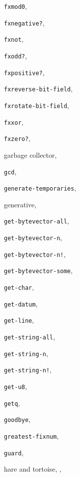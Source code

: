 {\begin{multicols}{2}
\texttt{fxmod0}, \textit{\pageref{objects_s161}}
  
\texttt{fxnegative?}, \textit{\pageref{objects_s154}}
  
\texttt{fxnot}, \textit{\pageref{objects_s163}}
  
\texttt{fxodd?}, \textit{\pageref{objects_s155}}
  
\texttt{fxpositive?}, \textit{\pageref{objects_s154}}
  
\texttt{fxreverse-bit-field}, \textit{\pageref{objects_s175}}
  
\texttt{fxrotate-bit-field}, \textit{\pageref{objects_s174}}
  
\texttt{fxxor}, \textit{\pageref{objects_s163}}
  
\texttt{fxzero?}, \textit{\pageref{objects_s154}}
  
garbage collector, \pageref{intro_s3}
  
\texttt{gcd}, \textit{\pageref{objects_s109}}
  
\texttt{generate-temporaries}, \textit{\pageref{syntax_s49}}
  
generative, \pageref{records_s4}
  
\texttt{get-bytevector-all}, \textit{\pageref{io_s60}}
  
\texttt{get-bytevector-n}, \textit{\pageref{io_s57}}
  
\texttt{get-bytevector-n!}, \textit{\pageref{io_s58}}
  
\texttt{get-bytevector-some}, \textit{\pageref{io_s59}}
  
\texttt{get-char}, \textit{\pageref{io_s61}}
  
\texttt{get-datum}, \textit{\pageref{io_s67}}
  
\texttt{get-line}, \textit{\pageref{io_s66}}
  
\texttt{get-string-all}, \textit{\pageref{io_s65}}
  
\texttt{get-string-n}, \textit{\pageref{io_s63}}
  
\texttt{get-string-n!}, \textit{\pageref{io_s64}}
  
\texttt{get-u8}, \textit{\pageref{io_s55}}
  
\texttt{getq}, \pageref{start_s184}
  
\texttt{goodbye}, \pageref{start_s133}
  
\texttt{greatest-fixnum}, \textit{\pageref{objects_s151}}
  
\texttt{guard}, \textit{\pageref{exceptions_s8}}
  
hare and tortoise, \pageref{start_s202}, \pageref{further_s40}
  

\end{multicols}}
